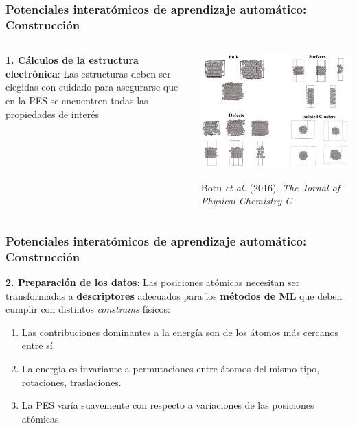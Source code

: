 \documentclass[aspectratio=169]{beamer}
\let\oldtextbf\textbf
\renewcommand{\textbf}[1]{\textcolor{nordblue}{\oldtextbf{#1}}}
\begin{document}
    \begin{frame}
        \frametitle{Potenciales interatómicos de aprendizaje automático: Construcción}
        
        \begin{columns}
            \textbf{1. Cálculos de la estructura electrónica}: Las estructuras deben
            ser elegidas con cuidado para asegurarse que en la PES se encuentren 
            todas las propiedades de interés

            \begin{center}
                \includegraphics[width=\columnwidth]{intro-dft_data.png}

                \tiny{Botu \textit{et al.} (2016). \textit{The Jornal of Physical
                Chemistry C}}
            \end{center}
        \end{columns}

    \end{frame}
    
    \begin{frame}
        \frametitle{Potenciales interatómicos de aprendizaje automático: Construcción}

        \textbf{2. Preparación de los datos}: Las posiciones atómicas necesitan 
        ser transformadas a \textbf{descriptores} adecuados para los 
        \textbf{métodos de ML} que deben cumplir con distintos \textit{constrains} 
        físicos:
        \begin{enumerate}
            \item Las contribuciones dominantes a la energía son de los átomos 
                más cercanos entre sí.
            \item La energía es invariante a permutaciones entre átomos del mismo 
                tipo, rotaciones, traslaciones.
            \item La PES varía suavemente con respecto a variaciones de las
                posiciones atómicas.
        \end{enumerate}

	\end{frame}
    
\end{document}
